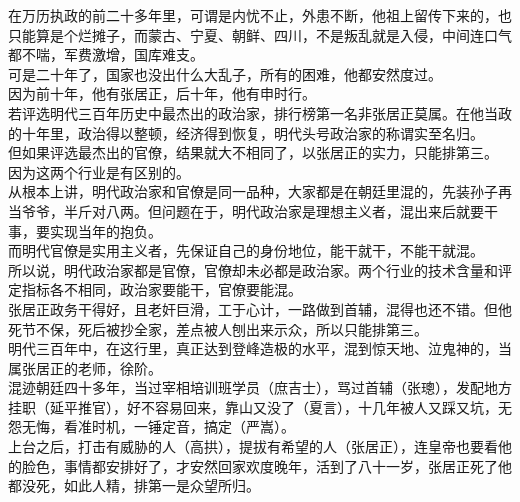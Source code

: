 	\begin{multicols}{\theparacolNo}
\fi
在万历执政的前二十多年里，可谓是内忧不止，外患不断，他祖上留传下来的，也只能算是个烂摊子，而蒙古、宁夏、朝鲜、四川，不是叛乱就是入侵，中间连口气都不喘，军费激增，国库难支。\\

可是二十年了，国家也没出什么大乱子，所有的困难，他都安然度过。\\

因为前十年，他有张居正，后十年，他有申时行。\\

若评选明代三百年历史中最杰出的政治家，排行榜第一名非张居正莫属。在他当政的十年里，政治得以整顿，经济得到恢复，明代头号政治家的称谓实至名归。\\

但如果评选最杰出的官僚，结果就大不相同了，以张居正的实力，只能排第三。\\

因为这两个行业是有区别的。\\

从根本上讲，明代政治家和官僚是同一品种，大家都是在朝廷里混的，先装孙子再当爷爷，半斤对八两。但问题在于，明代政治家是理想主义者，混出来后就要干事，要实现当年的抱负。\\

而明代官僚是实用主义者，先保证自己的身份地位，能干就干，不能干就混。\\

所以说，明代政治家都是官僚，官僚却未必都是政治家。两个行业的技术含量和评定指标各不相同，政治家要能干，官僚要能混。\\

张居正政务干得好，且老奸巨滑，工于心计，一路做到首辅，混得也还不错。但他死节不保，死后被抄全家，差点被人刨出来示众，所以只能排第三。\\

明代三百年中，在这行里，真正达到登峰造极的水平，混到惊天地、泣鬼神的，当属张居正的老师，徐阶。\\

混迹朝廷四十多年，当过宰相培训班学员（庶吉士），骂过首辅（张璁），发配地方挂职（延平推官），好不容易回来，靠山又没了（夏言），十几年被人又踩又坑，无怨无悔，看准时机，一锤定音，搞定（严嵩）。\\

上台之后，打击有威胁的人（高拱），提拔有希望的人（张居正），连皇帝也要看他的脸色，事情都安排好了，才安然回家欢度晚年，活到了八十一岁，张居正死了他都没死，如此人精，排第一是众望所归。\\


\end{multicols}
